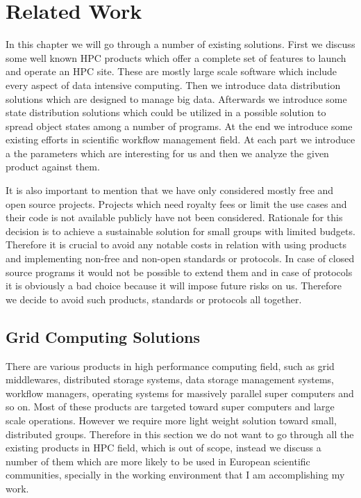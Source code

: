 \chapter{Related Work}
\label{cha:literature}

In this chapter we will go through a number of existing solutions. First we discuss some well known
HPC products which offer a complete set of features to launch and operate an HPC site. These are
mostly large scale software which include every aspect of data intensive computing. 
Then we introduce data distribution solutions which are designed to manage big data. Afterwards
we introduce some state distribution solutions which could be utilized in a possible solution to
spread object states among a number of programs. At the end we introduce some existing efforts
in scientific workflow management field. At each part we introduce a the parameters which are
interesting for us and then we analyze the given product against them.

It is also important to mention that we have only considered mostly free and open source projects. 
Projects which need royalty fees or limit the use cases and their code is not available
publicly have not been considered. Rationale for this decision is to achieve a 
sustainable solution for small groups with limited budgets. Therefore it is crucial to avoid
any notable costs in relation with using products and implementing non-free and non-open standards or protocols.
In case of closed source programs it would not be possible to extend them and in case of protocols it is
obviously a bad choice because it will impose future risks on us. 
Therefore we decide to avoid such products, standards or protocols all together.


\section{Grid Computing Solutions}
There are various products in high performance computing field, such as grid middlewares, distributed
storage systems, data storage management systems, workflow managers, operating systems for massively parallel 
super computers and so on. Most of these products are targeted toward super computers and large scale
operations. However we require more light weight solution toward small, distributed groups. 
Therefore in this section we do not want to go through
all the existing products in HPC field, which is out of scope, instead we discuss a number of them
which are more likely to be used in European scientific communities, specially in the working 
environment that I am accomplishing my work.

